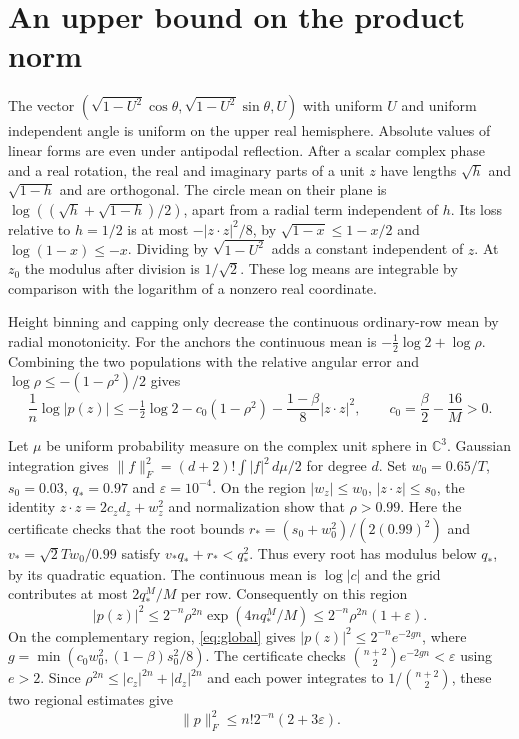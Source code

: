 \documentclass[11pt]{article}
\begin{document}
\section{An upper bound on the product norm}

The vector $(\sqrt{1-U^2}\cos\theta,\sqrt{1-U^2}\sin\theta,U)$ with uniform $U$ and uniform independent angle is uniform on the upper real hemisphere. Absolute values of linear forms are even under antipodal reflection. After a scalar complex phase and a real rotation, the real and imaginary parts of a unit $z$ have lengths $\sqrt h$ and $\sqrt{1-h}$ and are orthogonal. The circle mean on their plane is $\log((\sqrt h+\sqrt{1-h})/2)$, apart from a radial term independent of $h$. Its loss relative to $h=1/2$ is at most $-|z\cdot z|^2/8$, by $\sqrt{1-x}\le1-x/2$ and $\log(1-x)\le-x$. Dividing by $\sqrt{1-U^2}$ adds a constant independent of $z$. At $z_0$ the modulus after division is $1/\sqrt2$. These log means are integrable by comparison with the logarithm of a nonzero real coordinate.

Height binning and capping only decrease the continuous ordinary-row mean by radial monotonicity. For the anchors the continuous mean is $-\tfrac12\log 2+\log\rho$. Combining the two populations with the relative angular error and $\log\rho\le-(1-\rho^2)/2$ gives
\begin{equation}\label{eq:global}
 \frac1n\log|p(z)|\le-\tfrac12\log2-c_0(1-\rho^2)-\frac{1-\beta}{8}|z\cdot z|^2,
 \qquad c_0=\frac\beta2-\frac{16}{M}>0.
\end{equation}

Let $\mu$ be uniform probability measure on the complex unit sphere in $\mathbb C^3$. Gaussian integration gives $\|f\|_F^2=(d+2)!\int|f|^2\,d\mu/2$ for degree $d$. Set $w_0=0.65/T$, $s_0=0.03$, $q_*=0.97$ and $\varepsilon=10^{-4}$. On the region $|w_z|\le w_0$, $|z\cdot z|\le s_0$, the identity $z\cdot z=2c_zd_z+w_z^2$ and normalization show that $\rho>0.99$. Here the certificate checks that the root bounds $r_*=(s_0+w_0^2)/(2(0.99)^2)$ and $v_*=\sqrt2 T w_0/0.99$ satisfy $v_*q_*+r_*<q_*^2$. Thus every root has modulus below $q_*$, by its quadratic equation. The continuous mean is $\log|c|$ and the grid contributes at most $2q_*^M/M$ per row. Consequently on this region
\[
 |p(z)|^2\le2^{-n}\rho^{2n}\exp(4nq_*^M/M)\le2^{-n}\rho^{2n}(1+\varepsilon).
\]
On the complementary region, \eqref{eq:global} gives $|p(z)|^2\le2^{-n}e^{-2gn}$, where $g=\min(c_0w_0^2,(1-\beta)s_0^2/8)$. The certificate checks $\binom{n+2}2 e^{-2gn}<\varepsilon$ using $e>2$. Since $\rho^{2n}\le|c_z|^{2n}+|d_z|^{2n}$ and each power integrates to $1/\binom{n+2}2$, these two regional estimates give
\begin{equation}\label{eq:product}
 \|p\|_F^2\le n!2^{-n}(2+3\varepsilon).
\end{equation}
\end{document}
